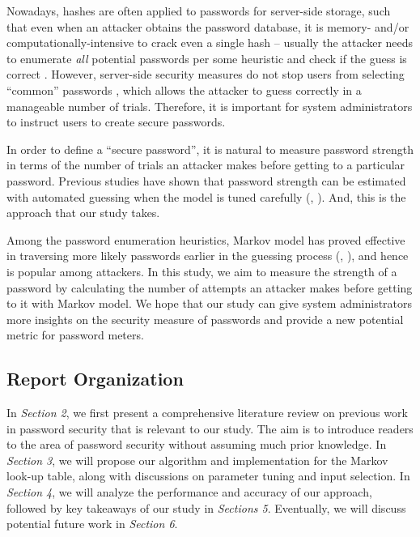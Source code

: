 \documentclass{article} %
\theoremstyle{definition}
\theoremstyle{theorem}
\theoremstyle{remark}
\theoremstyle{remark}
\begin{document}
\par\quad Nowadays, hashes are often applied to passwords for server-side storage, such that even when an attacker obtains the password database, it is memory- and/or computationally-intensive to crack even a single hash -- usually the attacker needs to enumerate \textit{all} potential passwords per some heuristic and check if the guess is correct \cite{bcrypt}. However, server-side security measures do not stop users from selecting ``common'' passwords \cite{easypass}, which allows the attacker to guess correctly in a manageable number of trials. Therefore, it is important for system administrators to instruct users to create secure passwords.

\par\quad In order to define a ``secure password'', it is natural to measure password strength in terms of the number of trials an attacker makes before getting to a particular password. Previous studies have shown that password strength can be estimated with automated guessing when the model is tuned carefully (\cite{guessability}, \cite{probabilistic}). And, this is the approach that our study takes.

\par\quad Among the password enumeration heuristics, Markov model has proved effective in traversing more likely passwords earlier in the guessing process (\cite{omen}, \cite{guessability}), and hence is popular among attackers. In this study, we aim to measure the strength of a password by calculating the number of attempts an attacker makes before getting to it with Markov model. We hope that our study can give system administrators more insights on the security measure of passwords and provide a new potential metric for password meters.

\subsection{Report Organization}
\par\quad In \emph{Section 2}, we first present a comprehensive literature review on previous work in password security that is relevant to our study. The aim is to introduce readers to the area of password security without assuming much prior knowledge. In \emph{Section 3}, we will propose our algorithm and implementation for the Markov look-up table, along with discussions on parameter tuning and input selection. In \emph{Section 4}, we will analyze the performance and accuracy of our approach, followed by key takeaways of our study in \emph{Sections 5}. Eventually, we will discuss potential future work in \emph{Section 6}.
\end{document}
